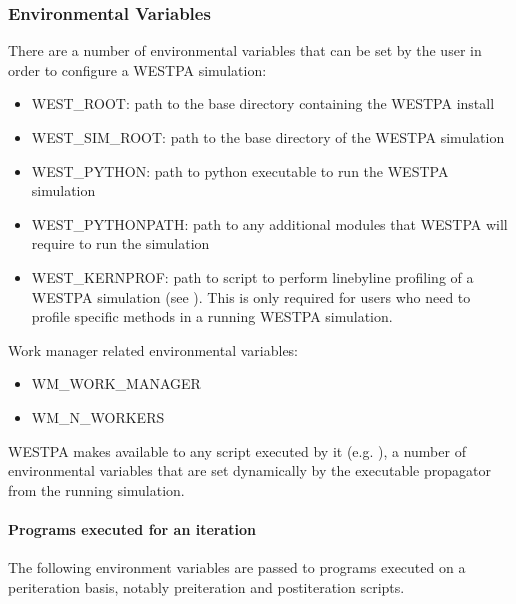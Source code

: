 \documentclass[letterpaper,10pt,english]{sphinxmanual}
\begin{document}
\subsubsection{Environmental Variables}
\label{\detokenize{users_guide/west/setup:environmental-variables}}
There are a number of environmental variables that can be set by the user in
order to configure a WESTPA simulation:
\begin{itemize}
\item {} 
WEST\_ROOT: path to the base directory containing the WESTPA install

\item {} 
WEST\_SIM\_ROOT: path to the base directory of the WESTPA simulation

\item {} 
WEST\_PYTHON: path to python executable to run the WESTPA simulation

\item {} 
WEST\_PYTHONPATH: path to any additional modules that WESTPA will require to
run the simulation

\item {} 
WEST\_KERNPROF: path to  script to perform line\sphinxhyphen{}by\sphinxhyphen{}line
profiling of a WESTPA simulation (see ). This is only required for users
who need to profile specific methods in a running WESTPA simulation.

\end{itemize}

Work manager related environmental variables:
\begin{itemize}
\item {} 
WM\_WORK\_MANAGER

\item {} 
WM\_N\_WORKERS

\end{itemize}

WESTPA makes available to any script executed by it (e.g. ), a
number of environmental variables that are set dynamically by the executable
propagator from the running simulation.


\paragraph{Programs executed for an iteration}
\label{\detokenize{users_guide/west/setup:programs-executed-for-an-iteration}}
The following environment variables are passed to programs executed on a
per\sphinxhyphen{}iteration basis, notably pre\sphinxhyphen{}iteration and post\sphinxhyphen{}iteration scripts.
\end{document}
